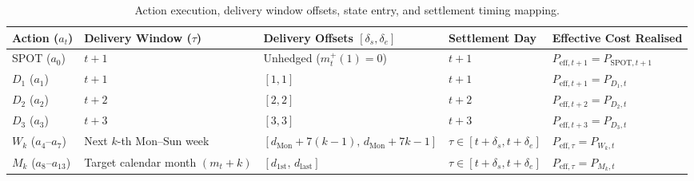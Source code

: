 \begin{table}[!t]
\centering
\footnotesize
\setlength{\tabcolsep}{4pt}
\caption{Action execution, delivery window offsets, state entry, and settlement timing mapping.}
\label{tab:action_settlement_mapping}
\begin{tabularx}{\linewidth}{@{} >{\hsize=0.65\hsize\raggedright\arraybackslash}X
                                  >{\hsize=1.15\hsize\raggedright\arraybackslash}X
                                  >{\hsize=1.20\hsize\raggedright\arraybackslash}X
                                  >{\hsize=0.95\hsize\raggedright\arraybackslash}X
                                  >{\hsize=1.05\hsize\raggedright\arraybackslash}X@{}}
\toprule
\textbf{Action ($a_t$)} & \textbf{Delivery Window ($\tau$)} & \textbf{Delivery Offsets $[\delta_s, \delta_e]$} & \textbf{Settlement Day} & \textbf{Effective Cost Realised} \\
\midrule
SPOT ($a_0$) & $t+1$ & Unhedged ($m_t^+(1) = 0$) & $t+1$ & $P_{\text{eff}, t+1} = P_{\text{SPOT}, t+1}$ \\
$D_1$ ($a_1$) & $t+1$ & $[1, 1]$ & $t+1$ & $P_{\text{eff}, t+1} = P_{D_1, t}$ \\
$D_2$ ($a_2$) & $t+2$ & $[2, 2]$ & $t+2$ & $P_{\text{eff}, t+2} = P_{D_2, t}$ \\
$D_3$ ($a_3$) & $t+3$ & $[3, 3]$ & $t+3$ & $P_{\text{eff}, t+3} = P_{D_3, t}$ \\
$W_k$ ($a_4$--$a_7$) & Next $k$-th Mon--Sun week & $[d_{\text{Mon}}+7(k-1),\, d_{\text{Mon}}+7k-1]$ & $\tau \in [t+\delta_s, t+\delta_e]$ & $P_{\text{eff}, \tau} = P_{W_k, t}$ \\
$M_k$ ($a_8$--$a_{13}$) & Target calendar month $(m_t+k)$ & $[d_{\text{1st}},\, d_{\text{last}}]$ & $\tau \in [t+\delta_s, t+\delta_e]$ & $P_{\text{eff}, \tau} = P_{M_k, t}$ \\
\bottomrule
\end{tabularx}
\end{table}

